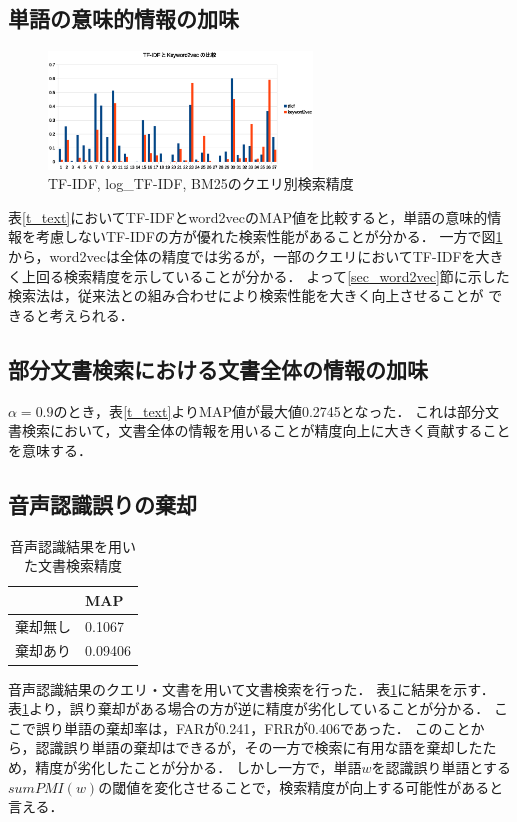 \subsection{単語の意味的情報の加味}
\begin{figure}
    \centering
    \includegraphics[width=7cm]{./graph/TFIDF_keyword2vec.eps}
    \caption{TF-IDF, log\_TF-IDF, BM25のクエリ別検索精度}
    \label{fig_tf_word2vec}
\end{figure}
表\ref{t_text}においてTF-IDFとword2vecのMAP値を比較すると，単語の意味的情報を考慮しないTF-IDFの方が優れた検索性能があることが分かる．
一方で図\ref{fig_tf_word2vec}から，word2vecは全体の精度では劣るが，一部のクエリにおいてTF-IDFを大きく上回る検索精度を示していることが分かる．
よって\ref{sec_word2vec}節に示した検索法は，従来法との組み合わせにより検索性能を大きく向上させることが
できると考えられる．

\subsection{部分文書検索における文書全体の情報の加味}
$\alpha = 0.9$のとき，表\ref{t_text}よりMAP値が最大値0.2745となった．
これは部分文書検索において，文書全体の情報を用いることが精度向上に大きく貢献することを意味する．

\subsection{音声認識誤りの棄却}
\begin{table}[htbp]
    \begin{center}
        \caption{音声認識結果を用いた文書検索精度}
        \begin{tabular}{|c|l|}
            \hline
                     &   MAP   \\ \hline
            棄却無し & 0.1067 \\ \hline
            棄却あり & 0.09406 \\ \hline
        \end{tabular}
        \label{t_spoken}
    \end{center}
\end{table}
音声認識結果のクエリ・文書を用いて文書検索を行った．
表\ref{t_spoken}に結果を示す．
表\ref{t_spoken}より，誤り棄却がある場合の方が逆に精度が劣化していることが分かる．
ここで誤り単語の棄却率は，FARが0.241，FRRが0.406であった．
このことから，認識誤り単語の棄却はできるが，その一方で検索に有用な語を棄却したため，精度が劣化したことが分かる．
しかし一方で，単語$w$を認識誤り単語とする$sumPMI(w)$の閾値を変化させることで，検索精度が向上する可能性があると言える．

